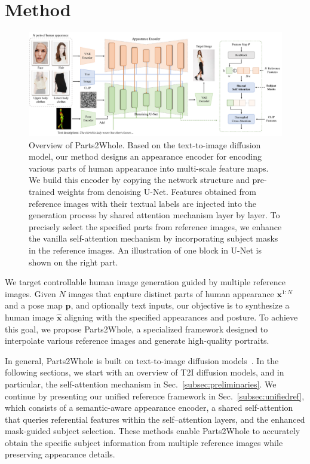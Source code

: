 \section{Method}

\begin{figure}
    \centering
    \includegraphics[width=\textwidth]{figure/overview.pdf}
    \caption{Overview of Parts2Whole. Based on the text-to-image diffusion model, our method designs an appearance encoder for encoding various parts of human appearance into multi-scale feature maps. We build this encoder by copying the network structure and pre-trained weights from denoising U-Net. Features obtained from reference images with their textual labels are injected into the generation process by shared attention mechanism layer by layer. To precisely select the specified parts from reference images, we enhance the vanilla self-attention mechanism by incorporating subject masks in the reference images. An illustration of one block in U-Net is shown on the right part.}
    \label{fig:overview}
\end{figure}

We target controllable human image generation guided by multiple reference images. Given $N$ images that capture distinct parts of human appearance $\bm{x}^{1:N}$ and a pose map $\bm{p}$, and optionally text inputs, our objective is to synthesize a human image $\hat{\bm{x}}$ aligning with the specified appearances and posture. To achieve this goal, we propose Parts2Whole, a specialized framework designed to interpolate various reference images and generate high-quality portraits.

In general, Parts2Whole is built on text-to-image diffusion models~\cite{rombach2022ldm}. In the following sections, we start with an overview of T2I diffusion models, and in particular, the self-attention mechanism in Sec.~\ref{subsec:preliminaries}. We continue by presenting our unified reference framework in Sec.~\ref{subsec:unifiedref}, which consists of a semantic-aware appearance encoder, a shared self-attention that queries referential features within the self–attention layers, and the enhanced mask-guided subject selection. These methods enable Parts2Whole to accurately obtain the specific subject information from multiple reference images while preserving appearance details.

